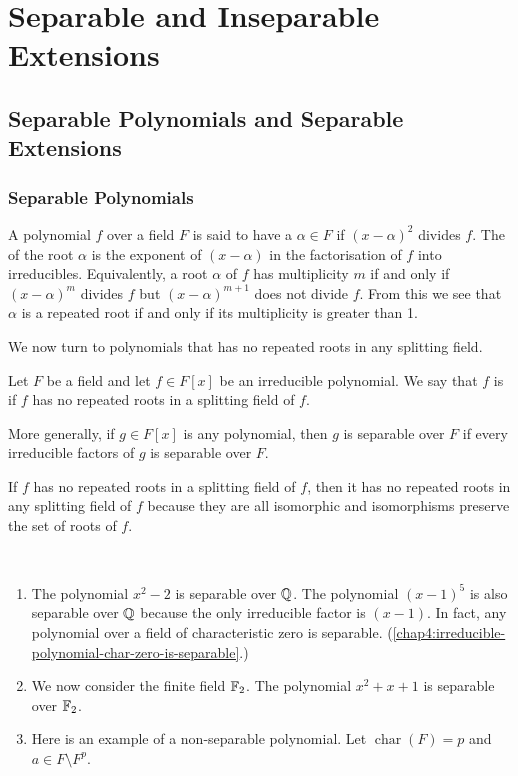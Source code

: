\chapter{Separable and Inseparable Extensions}

\section{Separable Polynomials and Separable Extensions}

\subsection*{Separable Polynomials}

A polynomial $f$ over a field $F$ is said to have a  $\alpha \in F$ if $(x - \alpha)^2$ divides $f$. The  of the root $\alpha$ is the exponent of $(x - \alpha)$ in the factorisation of $f$ into irreducibles. Equivalently, a root $\alpha$ of $f$ has multiplicity $m$ if and only if $(x - \alpha)^m$ divides $f$ but $(x - \alpha)^{m + 1}$ does not divide $f$. From this we see that $\alpha$ is a repeated root if and only if its multiplicity is greater than 1.

We now turn to polynomials that has no repeated roots in any splitting field.

\begin{definition}
	Let $F$ be a field and let $f \in F[x]$ be an irreducible polynomial. We say that $f$ is  if $f$ has no repeated roots in a splitting field of $f$. 
	
	More generally, if $g \in F[x]$ is any polynomial, then $g$ is separable over $F$ if every irreducible factors of $g$ is separable over $F$.
\end{definition}

\begin{remark}
	If $f$ has no repeated roots in a splitting field of $f$, then it has no repeated roots in any splitting field of $f$ because they are all isomorphic and isomorphisms preserve the set of roots of $f$.
\end{remark}

\begin{example}~
	\begin{enumerate}
		\item The polynomial $x^2 - 2$ is separable over $\mathbb Q$. The polynomial $(x- 1)^5$ is also separable over $\mathbb Q$ because the only irreducible factor is $(x - 1)$. In fact, any polynomial over a field of characteristic zero is separable. (\cref{chap4:irreducible-polynomial-char-zero-is-separable}.)
		
		\item We now consider the finite field $\mathbb F_2$. The polynomial $x^2 + x + 1$ is separable over $\mathbb F_2$.
		
		\item Here is an example of a non-separable polynomial. Let $\operatorname{char}(F) = p$ and $a \in F \setminus F^p$. 
	\end{enumerate}
\end{example}

